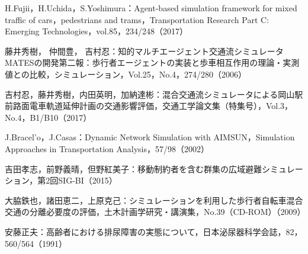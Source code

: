 \begin{thebibliography}{99}
  H.Fujii，H.Uchida，S.Yoshimura：Agent-based simulation framework for mixed traffic of cars，pedestrians and trams，Transportation Research Part C: Emerging Technologies，vol.85，234/248（2017）

  藤井秀樹， 仲間豊， 吉村忍：知的マルチエージェント交通流シミュレータMATESの開発第二報：歩行者エージェントの実装と歩車相互作用の理論・実測値との比較，シミュレーション，Vol.25，No.4，274/280（2006）

  吉村忍，藤井秀樹，内田英明，加納達彬：混合交通流シミュレータによる岡山駅前路面電車軌道延伸計画の交通影響評価，交通工学論文集（特集号），Vol.3，No.4，B1/B10（2017）

  J.Bracel’o，J.Casas：Dynamic Network Simulation with AIMSUN，Simulation Approaches in Transportation Analysis，57/98（2002）

  吉田孝志，前野義晴，但野紅美子：移動制約者を含む群集の広域避難シミュレーション，第2回SIG-BI（2015）

  大脇鉄也，諸田恵二，上原克己：シミュレーションを利用した歩行者自転車混合交通の分離必要度の評価，土木計画学研究・講演集，No.39（CD-ROM）（2009） 


  安藤正夫：高齢者における排尿障害の実態について，日本泌尿器科学会誌，82，560/564（1991）
\end{thebibliography}
